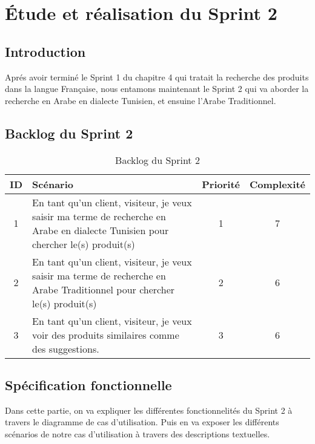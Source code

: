 \chapter{Étude et réalisation du Sprint 2}
\localtableofcontents

\newpage
\section{Introduction}
\noindent
Aprés avoir terminé le Sprint 1 du chapitre 4 qui tratait la recherche des produits dans la langue Française, nous entamons maintenant le Sprint 2 qui va aborder la recherche en Arabe en dialecte Tunisien, et ensuine l'Arabe Traditionnel.

\section{Backlog du Sprint 2}
\begin{table}[H]
	\centering

	\begin{tabularx}{\textwidth}{|c|X|c|c|}
		\hline
		\rowcolor{blue!20}
		\textbf{ID} & \textbf{Scénario}                                                                                     & \textbf{Priorité} & \textbf{Complexité} \\ \hline
		1           & En tant qu'un client, visiteur, je veux saisir ma terme de recherche en Arabe en dialecte Tunisien pour chercher le(s) produit(s) & 1                 & 7                  \\ \hline

	2           & En tant qu'un client, visiteur, je veux saisir ma terme de recherche en Arabe Traditionnel pour chercher le(s) produit(s) & 2                 & 6 \\ \hline
	3           & En tant qu'un client, visiteur, je veux voir des produits similaires comme des suggestions. & 3                 & 6 \\ \hline
	\end{tabularx}
	\caption{Backlog du Sprint 2}
	\label{tab:sprint2}
\end{table}

\section{Spécification fonctionnelle}
\noindent
Dans cette partie, on va expliquer les différentes fonctionnelités du Sprint 2 à travers le diagramme de cas d'utilisation. Puis en va exposer les différents scénarios de notre cas d'utilisation à travers des descriptions textuelles.



